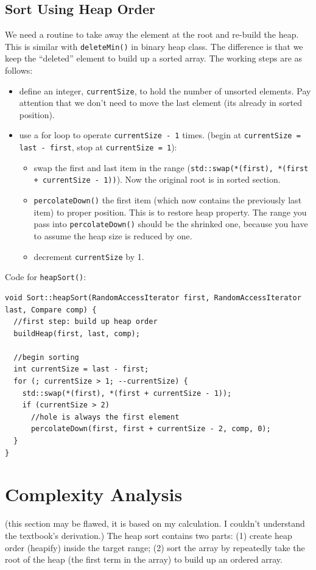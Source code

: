 \documentclass[11pt]{book}
\begin{document}
\subsection{Sort Using Heap Order}
\label{sec:orgda4e2ce}

We need a routine to take away the element at the root and re-build the heap. This is similar with \texttt{deleteMin()} in binary heap class. The difference is that we keep the ``deleted'' element to build up a sorted array. The working steps are as follows:
\begin{itemize}
\item define an integer, \texttt{currentSize}, to hold the number of unsorted elements. Pay attention that we don't need to move the last element (its already in sorted position).
\item use a for loop to operate \texttt{currentSize - 1} times. (begin at  \texttt{currentSize = last - first}, stop at \texttt{currentSize = 1}):
\begin{itemize}
\item swap the first and last item in the range (\texttt{std::swap(*(first), *(first + currentSize - 1))}). Now the original root is in sorted section.
\item \texttt{percolateDown()} the first item (which now contains the previously last item) to proper position. This is to restore heap property. The range you pass into \texttt{percolateDown()} should be the shrinked one, because you have to assume the heap size is reduced by one.
\item decrement \texttt{currentSize} by 1.
\end{itemize}
\end{itemize}


Code for \texttt{heapSort()}:
\begin{verbatim}
void Sort::heapSort(RandomAccessIterator first, RandomAccessIterator last, Compare comp) {
  //first step: build up heap order 
  buildHeap(first, last, comp);

  //begin sorting 
  int currentSize = last - first;
  for (; currentSize > 1; --currentSize) {
    std::swap(*(first), *(first + currentSize - 1));
    if (currentSize > 2)
      //hole is always the first element 
      percolateDown(first, first + currentSize - 2, comp, 0);
  }
}

\end{verbatim}
\section{Complexity Analysis}
\label{sec:orgad75fab}
(this section may be flawed, it is based on my calculation. I couldn't understand the textbook's derivation.)
The heap sort contains two parts: (1) create heap order (heapify) inside the target range; (2) sort the array by repeatedly take the root of the heap (the first term in the array) to build up an ordered array.
\end{document}
